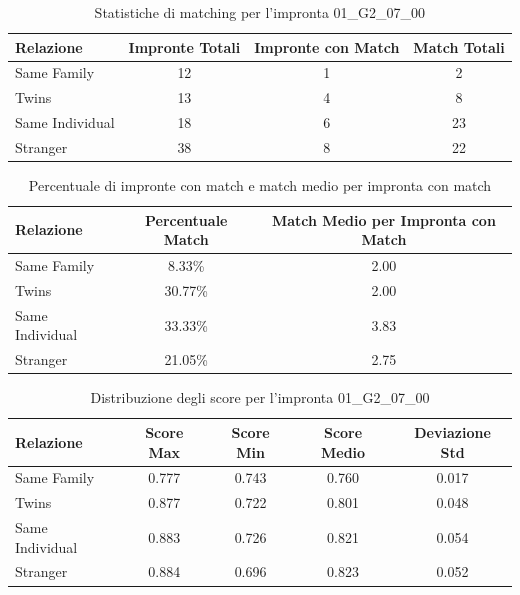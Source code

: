 \begin{table}[htbp]
\centering
\caption{Statistiche di matching per l'impronta 01\_G2\_07\_00}
\label{tab:results_01_G2_07_00}
\begin{tabular}{|l|c|c|c|}
\hline
\textbf{Relazione} & \textbf{Impronte Totali} & \textbf{Impronte con Match} & \textbf{Match Totali} \\
\hline
Same Family & 12 & 1 & 2 \\
\hline
Twins & 13 & 4 & 8 \\
\hline
Same Individual & 18 & 6 & 23 \\
\hline
Stranger & 38 & 8 & 22 \\
\hline
\end{tabular}
\end{table}


\begin{table}[htbp]
\centering
\caption{Percentuale di impronte con match e match medio per impronta con match}
\label{tab:match_percentage_01_G2_07_00}
\begin{tabular}{|l|c|c|}
\hline
\textbf{Relazione} & \textbf{Percentuale Match} & \textbf{Match Medio per Impronta con Match} \\
\hline
Same Family & 8.33\% & 2.00 \\
\hline
Twins & 30.77\% & 2.00 \\
\hline
Same Individual & 33.33\% & 3.83 \\
\hline
Stranger & 21.05\% & 2.75 \\
\hline
\end{tabular}
\end{table}


\begin{table}[htbp]
\centering
\caption{Distribuzione degli score per l'impronta 01\_G2\_07\_00}
\label{tab:scores_01_G2_07_00}
\begin{tabular}{|l|c|c|c|c|}
\hline
\textbf{Relazione} & \textbf{Score Max} & \textbf{Score Min} & \textbf{Score Medio} & \textbf{Deviazione Std} \\
\hline
Same Family & 0.777 & 0.743 & 0.760 & 0.017 \\
\hline
Twins & 0.877 & 0.722 & 0.801 & 0.048 \\
\hline
Same Individual & 0.883 & 0.726 & 0.821 & 0.054 \\
\hline
Stranger & 0.884 & 0.696 & 0.823 & 0.052 \\
\hline
\end{tabular}
\end{table}

